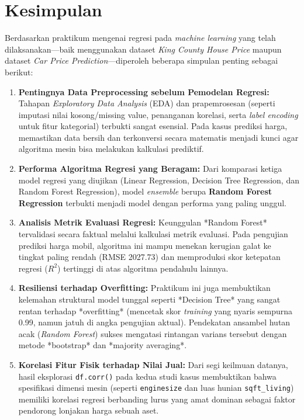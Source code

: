 \documentclass[a4paper,oneside,11pt]{book}
\begin{document}
\chapter{Kesimpulan}
\label{chap:kesimpulan}
Berdasarkan praktikum mengenai regresi pada \textit{machine learning} yang telah dilaksanakan—baik menggunakan dataset \textit{King County House Price} maupun dataset \textit{Car Price Prediction}—diperoleh beberapa simpulan penting sebagai berikut:

\begin{enumerate}
    \item \textbf{Pentingnya Data Preprocessing sebelum Pemodelan Regresi:} Tahapan \textit{Exploratory Data Analysis} (EDA) dan prapemrosesan (seperti imputasi nilai kosong/missing value, penanganan korelasi, serta \textit{label encoding} untuk fitur kategorial) terbukti sangat esensial. Pada kasus prediksi harga, memastikan data bersih dan terkonversi secara matematis menjadi kunci agar algoritma mesin bisa melakukan kalkulasi prediktif.
    
    \item \textbf{Performa Algoritma Regresi yang Beragam:} Dari komparasi ketiga model regresi yang diujikan (Linear Regression, Decision Tree Regression, dan Random Forest Regression), model \textit{ensemble} berupa \textbf{Random Forest Regression} terbukti menjadi model dengan performa yang paling unggul.
    
    \item \textbf{Analisis Metrik Evaluasi Regresi:} Keunggulan *Random Forest* tervalidasi secara faktual melalui kalkulasi metrik evaluasi. Pada pengujian prediksi harga mobil, algoritma ini mampu menekan kerugian galat ke tingkat paling rendah (RMSE 2027.73) dan memproduksi skor ketepatan regresi ($R^2$) tertinggi di atas algoritma pendahulu lainnya.
    
    \item \textbf{Resiliensi terhadap Overfitting:} Praktikum ini juga membuktikan kelemahan struktural model tunggal seperti *Decision Tree* yang sangat rentan terhadap *overfitting* (mencetak skor \textit{training} yang nyaris sempurna 0.99, namun jatuh di angka pengujian aktual). Pendekatan ansambel hutan acak (\textit{Random Forest}) sukses mengatasi rintangan varians tersebut dengan metode *bootstrap* dan *majority averaging*.
    
    \item \textbf{Korelasi Fitur Fisik terhadap Nilai Jual:} Dari segi keilmuan datanya, hasil eksplorasi \texttt{df.corr()} pada kedua studi kasus membuktikan bahwa spesifikasi dimensi mesin (seperti \texttt{enginesize} dan luas hunian \texttt{sqft\_living}) memiliki korelasi regresi berbanding lurus yang amat dominan sebagai faktor pendorong lonjakan harga sebuah aset.
\end{enumerate}
\end{document}
